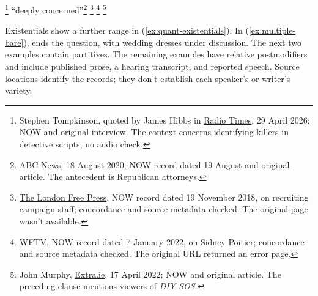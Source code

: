 \documentclass[12pt]{article}
\begin{document}
\ea\label{ex:quant-more-arguments}
\ea\label{ex:various-arg-rel} \footnote{Stephen Tompkinson, quoted by James Hibbs in \href{https://www.radiotimes.com/tv/drama/stephen-tompkinson-new-detective-role-exclusive-newsupdate/}{Radio Times}, 29 April 2026; NOW and original interview. The context concerns identifying killers in detective scripts; no audio check.}
\ex\label{ex:numerous-arg-rel}  \enquote{deeply concerned}\footnote{\href{https://abcnews.com/Politics/reversal-postmaster-general-dejoy-suspends-mail-handling-election/story?id=72446764}{ABC News}, 18 August 2020; NOW record dated 19 August and original article. The antecedent is Republican attorneys.}
\ex\label{ex:multiple-arg-rel} \footnote{\href{https://lfpress.com/pmn/news-pmn/2020-democratic-contenders-already-eyeing-top-staff-in-iowa/wcm/e9a17ae7-bcb2-420c-9141-442306ec38e4}{The London Free Press}, NOW record dated 19 November 2018, on recruiting campaign staff; concordance and source metadata checked. The original page wasn't available.}
\ex\label{ex:countless-arg-rel} \footnote{\href{https://www.wftv.com/entertainment/sidney-poitier/VYJKDUZBWNMX4M5UU4NM3RT52Y/}{WFTV}, NOW record dated 7 January 2022, on Sidney Poitier; concordance and source metadata checked. The original URL returned an error page.}
\ex\label{ex:countless-subj} \footnote{John Murphy, \href{https://extra.ie/2022/04/17/entertainment/movies-tv/i-bow-to-you-diy-sos-viewers-in-total-agreement-after-latest-inspirational-episode}{Extra.ie}, 17 April 2022; NOW and original article. The preceding clause mentions viewers of \textit{DIY SOS}.}
\z\z

Existentials show a further range in (\ref{ex:quant-existentials}). In (\ref{ex:multiple-bare}),  ends the question, with wedding dresses under discussion. The next two examples contain partitives. The remaining examples have relative postmodifiers and include published prose, a hearing transcript, and reported speech. Source locations identify the records; they don't establish each speaker's or writer's variety.
\end{document}
